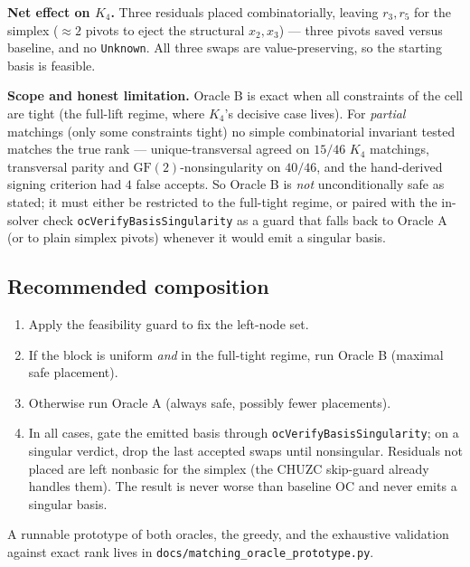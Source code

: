 \documentclass[11pt]{article}
\begin{document}
\textbf{Net effect on $K_4$.} Three residuals placed combinatorially, leaving
$r_3,r_5$ for the simplex ($\approx2$ pivots to eject the structural $x_2,x_3$)
--- three pivots saved versus baseline, and no \texttt{Unknown}. All three swaps
are value-preserving, so the starting basis is feasible.

\textbf{Scope and honest limitation.} Oracle B is exact when all constraints of
the cell are tight (the full-lift regime, where $K_4$'s decisive case lives). For
\emph{partial} matchings (only some constraints tight) no simple combinatorial
invariant tested matches the true rank --- unique-transversal agreed on $15/46$
$K_4$ matchings, transversal parity and $\mathrm{GF}(2)$-nonsingularity on
$40/46$, and the hand-derived signing criterion had $4$ false accepts. So Oracle
B is \emph{not} unconditionally safe as stated; it must either be restricted to
the full-tight regime, or paired with the in-solver check
\texttt{ocVerifyBasisSingularity} as a guard that falls back to Oracle A (or to
plain simplex pivots) whenever it would emit a singular basis.

\subsection{Recommended composition}

\begin{enumerate}[nosep]
  \item Apply the feasibility guard to fix the left-node set.
  \item If the block is uniform \emph{and} in the full-tight regime, run Oracle B
  (maximal safe placement).
  \item Otherwise run Oracle A (always safe, possibly fewer placements).
  \item In all cases, gate the emitted basis through
  \texttt{ocVerifyBasisSingularity}; on a singular verdict, drop the last
  accepted swaps until nonsingular. Residuals not placed are left nonbasic for
  the simplex (the CHUZC skip-guard already handles them). The result is never
  worse than baseline OC and never emits a singular basis.
\end{enumerate}

A runnable prototype of both oracles, the greedy, and the exhaustive validation
against exact rank lives in \texttt{docs/matching\_oracle\_prototype.py}.
\end{document}
